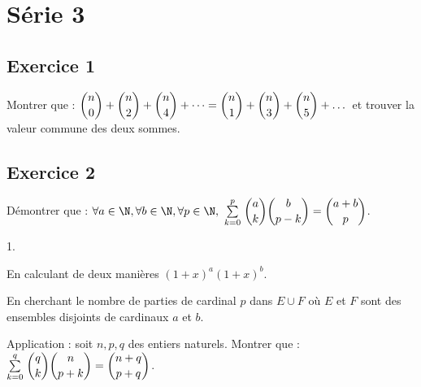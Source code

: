 \documentclass[11pt]{article}%
\begin{document}
      
      \newpage
      

\section{Série 3}

\subsection*{Exercice 1}
\noindent
Montrer que : $\dbinom{n}{0} + \dbinom{n}{2} + \dbinom{n}{4} + \dots =
  \dbinom{n}{1} + \dbinom{n}{3} + \dbinom{n}{5} + \dots$ et trouver la
  valeur commune des deux sommes.



\subsection*{Exercice 2}
\noindent
Démontrer que : $\forall a \in \N, \forall b \in \N, \forall p \in
  \N, \ \Sum{k=0}{p} \dbinom{a}{k} \dbinom{b}{p-k} = \dbinom{a+b}{p}$.
  \begin{noliste}{1.}
  \item En calculant de deux manières $(1+x)^a (1+x)^b$.
  \item En cherchant le nombre de parties de cardinal $p$ dans $E \cup
    F$ où $E$ et $F$ sont des ensembles disjoints de cardinaux $a$ et 
    $b$.
  \item Application : soit $n, p, q$ des entiers naturels. Montrer que
    : ${\textstyle\sum\limits_{k=0}^{q}}\hspace{.1cm} \dbinom{q}{k} \dbinom{n}{p+k} = 
    \dbinom{n+q}{p+q}$.
  \end{noliste}
\end{document}
